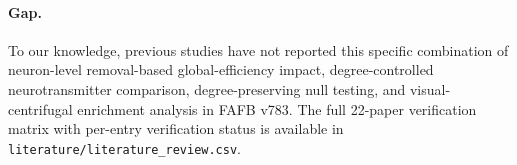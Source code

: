 \paragraph{Gap.} To our knowledge, previous studies have not reported this
specific combination of neuron-level removal-based global-efficiency
impact, degree-controlled neurotransmitter comparison, degree-preserving
null testing, and visual-centrifugal enrichment analysis in FAFB v783.
The full 22-paper verification matrix with per-entry verification status
is available in \texttt{literature/literature\_review.csv}.
